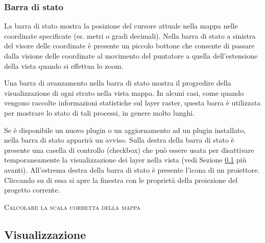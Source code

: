 \subsubsection{Barra di stato}\label{label_statusbar}

La barra di stato mostra la posizione del cursore attuale nella mappa nelle
coordinate specificate (es. metri o gradi decimali).
Nella barra di stato a sinistra del visore delle coordinate è presente un
piccolo bottone che consente di passare dalla visione delle coordinate al
movimento del puntatore a
quella dell'estensione della vista quando si effettua lo zoom. 

Una barra di avanzamento nella barra di stato mostra il progredire della
visualizzazione di ogni strato nella vista mappa. In alcuni casi, come quando
vengono raccolte informazioni statistiche sul layer raster, questa barra è
utilizzata per mostrare lo stato di tali processi, in genere molto lunghi. 

Se è disponibile un nuovo plugin o un aggiornamento ad un plugin installato,
nella barra di stato apparirà un avviso. Sulla destra della barra di stato è
presente una casella di controllo (checkbox) che può essere usata per
disattivare temporaneamente la visualizzazione dei layer nella vista (vedi
Sezione \ref{subsec:redraw_events} più avanti). All'estrema destra della barra
di stato è presente l'icona di un proiettore. Cliccando su di essa si apre la
finestra con le proprietà della proiezione del progetto corrente.

\begin{Tip}\caption{\textsc{Calcolare la scala corretta della mappa}}
\end{Tip}

\subsection{Visualizzazione}\label{subsec:redraw_events}

